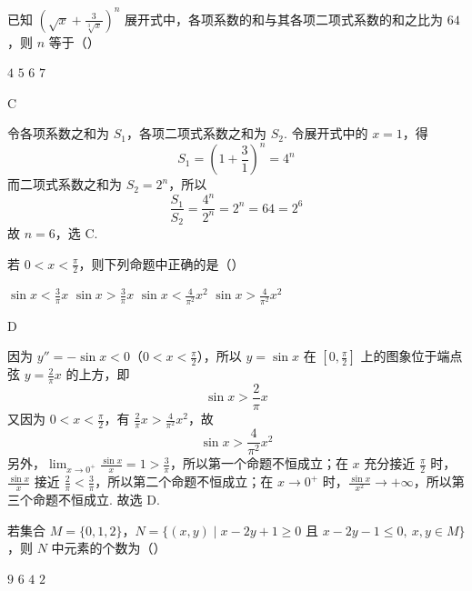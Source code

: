 \begin{problem}
已知 \(\left(\sqrt{x} + \frac{3}{\sqrt[3]{x}}\right)^n\) 展开式中，各项系数的和与其各项二项式系数的和之比为 \(64\)，则 \(n\) 等于（\quad）

\choices
    {\(4\)}
    {\(5\)}
    {\(6\)}
    {\(7\)}
\end{problem}

\begin{answer}
C
\end{answer}

\begin{solution}
令各项系数之和为 \(S_1\)，各项二项式系数之和为 \(S_2\). 令展开式中的 \(x=1\)，得
\[
S_1=\left(1+\frac{3}{1}\right)^n=4^n
\]
而二项式系数之和为 \(S_2=2^n\)，所以
\[
\frac{S_1}{S_2}=\frac{4^n}{2^n}=2^n=64=2^6
\]
故 \(n=6\)，选 C.
\end{solution}

\begin{problem}
若 \(0 < x < \frac{\pi}{2}\)，则下列命题中正确的是（\quad）

\choices
    {\(\sin x < \frac{3}{\pi}x\)}
    {\(\sin x > \frac{3}{\pi}x\)}
    {\(\sin x < \frac{4}{\pi^{2}}x^{2}\)}
    {\(\sin x > \frac{4}{\pi^{2}}x^{2}\)}
\end{problem}

\begin{answer}
D
\end{answer}

\begin{solution}
因为 \(y''=-\sin x<0\)（\(0<x<\frac{\pi}{2}\)），所以 \(y=\sin x\) 在 \(\left[0,\frac{\pi}{2}\right]\) 上的图象位于端点弦 \(y=\frac{2}{\pi}x\) 的上方，即
\[
\sin x>\frac{2}{\pi}x
\]
又因为 \(0<x<\frac{\pi}{2}\)，有 \(\frac{2}{\pi}x>\frac{4}{\pi^2}x^2\)，故
\[
\sin x>\frac{4}{\pi^2}x^2
\]
另外，\(\displaystyle\lim_{x\to0^+}\frac{\sin x}{x}=1>\frac{3}{\pi}\)，所以第一个命题不恒成立；在 \(x\) 充分接近 \(\frac{\pi}{2}\) 时，\(\frac{\sin x}{x}\) 接近 \(\frac{2}{\pi}<\frac{3}{\pi}\)，所以第二个命题不恒成立；在 \(x\to0^+\) 时，\(\frac{\sin x}{x^2}\to+\infty\)，所以第三个命题不恒成立.
故选 D.
\end{solution}

\begin{problem}
若集合 \(M = \{0, 1, 2\}\)，\(N = \{(x, y) \mid x - 2y + 1 \geqslant 0 \text{ 且 } x - 2y - 1 \leqslant 0,\ x, y \in M\}\)，则 \(N\) 中元素的个数为（\quad）

\choices
    {\(9\)}
    {\(6\)}
    {\(4\)}
    {\(2\)}
\end{problem}


